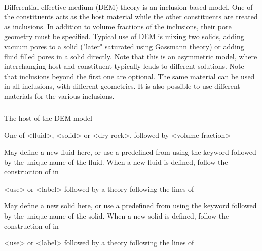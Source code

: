 {\paragraph{}
 \slist
   \item \Description Differential effective medium (DEM) theory is an inclusion based model. One of the constituents acts as the host material while the other constituents are treated as inclusions. In addition to volume fractions of the inclusions, their pore geometry must be specified. Typical use of DEM is mixing two solids, adding vacuum pores to a solid ("later" saturated using Gassmann theory) or adding fluid filled pores in a solid directly. Note that this is an asymmetric model, where interchanging host and constituent typically leads to different solutions. Note that inclusions beyond the first one are optional. The same material can be used in all inclusions, with different geometries. It is also possible to use different materials for the various inclusions.
   \item \Argument
   \item \Default
 \elist

\subparagraph{}
 \slist
   \item \Description The host of the DEM model
   \item \Argument One of <fluid>, <solid> or <dry-rock>, followed by <volume-fraction>
   \item \Default
 \elist

 \slist
   \item \Description May define a new fluid here, or use a predefined  from  using the keyword  followed by the unique name of the fluid. When a new fluid is defined, follow the construction of  in 
   \item \Argument <use> or <label> followed by a theory following the lines of 
   \item \Default
 \elist

 \slist
   \item \Description May define a new solid here, or use a predefined  from  using the keyword  followed by the unique name of the solid. When a new solid is defined, follow the construction of  in 
   \item \Argument <use> or <label> followed by a theory following the lines of 
   \item \Default
 \elist

}
